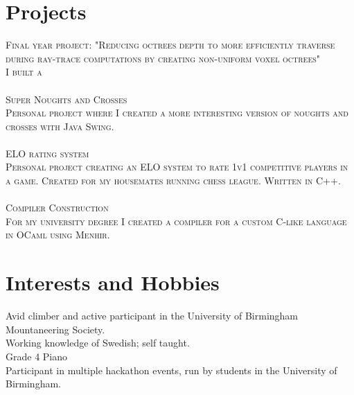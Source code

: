 \documentclass[a4paper, 10pt]{article}
\begin{document}
\section{Projects}
 \textsc{Final year project: "Reducing octrees depth to more efficiently traverse during ray-trace computations by creating non-uniform voxel octrees"}\\
 \footnotesize \textsc{I built a }\\\\
 \textsc{Super Noughts and Crosses}\\
 \footnotesize\textsc{Personal project where I created a more interesting version of noughts and crosses with Java Swing.}\\\\
 \normalsize\textsc{ELO rating system}\\
 \footnotesize\textsc{Personal project creating an ELO system to rate 1v1 competitive players in a game. Created for my housemates running chess league. Written in C++.}\\\\
 \normalsize\textsc{Compiler Construction}\\
 \footnotesize\textsc{For my university degree I created a compiler for a custom C-like language in OCaml using Menhir.}
 
\normalsize
\section{Interests and Hobbies}
 Avid climber and active participant in the University of Birmingham Mountaneering Society.\\
 Working knowledge of Swedish; self taught.\\
 Grade 4 Piano\\
 Participant in multiple hackathon events, run by students in the University of Birmingham.\\
\end{document}
